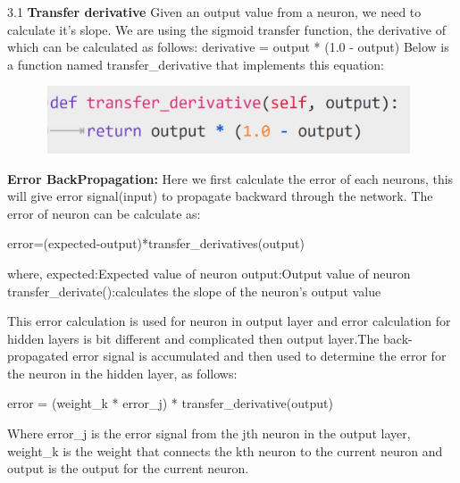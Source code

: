 { 3.1 \textbf{Transfer derivative}\newline
 Given an output value from a neuron, we need to calculate it’s slope. We are using the sigmoid transfer function, the derivative of which can be calculated as follows:\newline
        derivative = output * (1.0 - output)\newline
 Below is a function named transfer\_derivative that implements this equation:
 \begin{figure}[H]
\begin{center}
\includegraphics[width=110mm,height=20mm]{backexplain/transferDerivative.jpg}
\end{center}
\end{figure} 

 \textbf{Error BackPropagation:}\newline
Here we first calculate the error of each neurons, this will give error signal(input) to propagate backward through the network.\newline
The error of neuron can be calculate as:\newline
 \centerline{error=(expected-output)*transfer\_derivatives(output)}
where,\newline
expected:Expected value of neuron \newline 
output:Output value of neuron\newline
transfer\_derivate():calculates the slope of the neuron’s output value

This error calculation is used for neuron in output layer and error calculation for hidden layers is bit different and complicated then output layer.\newline The back-propagated error signal is accumulated and then used to determine the error for the neuron in the hidden layer, as follows:\newline
           \centerline{error = (weight\_k * error\_j) * transfer\_derivative(output)}
Where error\_j is the error signal from the jth neuron in the output layer, weight\_k is the weight that connects the kth neuron to the current neuron and output is the output for the current neuron.

}

